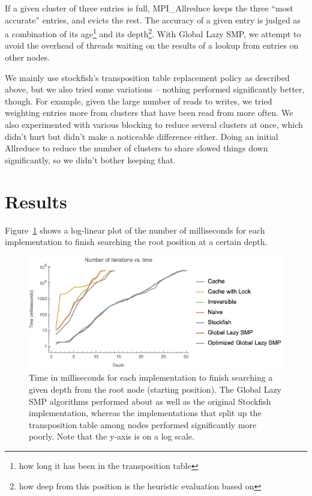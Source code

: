 \documentclass{article}
\begin{document}
If a given cluster of three entries is full, {MPI\_Allreduce}
keeps the three ``most accurate'' entries, and evicts the rest. The accuracy of
a given entry is judged as a combination of its age\footnote{how long it has
been in the transposition table} and its depth\footnote{how deep from this
position is the heuristic evaluation based on}. With Global Lazy SMP, we
attempt to avoid the overhead of threads waiting on the results of a lookup from
entries on other nodes.

We mainly use stockfish's transposition table replacement policy as described
above, but we also tried some variations -- nothing performed significantly
better, though. For example, given the large number of reads to writes, we
tried weighting entries more from clusters that have been read from more often.
We also experimented with various blocking to reduce several clusters at once,
which didn't hurt but didn't make a noticeable difference either. Doing an
initial Allreduce to reduce the number of clusters to share slowed things down
significantly, so we didn't bother keeping that.

\section{Results}\label{Results}
Figure~\ref{fig:ttd} shows a log-linear plot of the number of milliseconds for
each implementation to finish searching the root position at a certain depth. 

\begin{figure}
	\includegraphics[width=\textwidth]{../plots/timetodepth}
	\caption{Time in milliseconds for each implementation to finish
	searching a given depth from the root node (starting position). The
	Global Lazy SMP algorithms performed about as well as the original
	Stockfish implementation, whereas the implementations that split up the
	transposition table among nodes performed significantly more poorly.
	Note that the y-axis is on a log scale.}
	\label{fig:ttd}
\end{figure}
\end{document}
